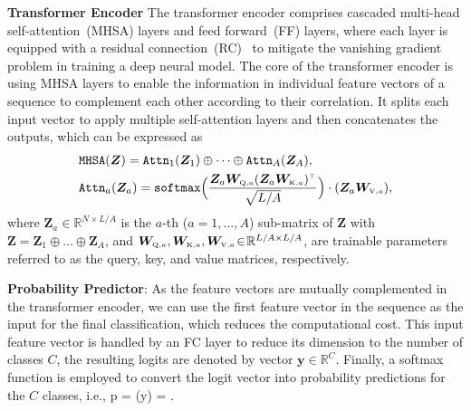 \textbf{Transformer Encoder}
The transformer encoder comprises cascaded multi-head self-attention~(MHSA) layers and feed forward~(FF) layers, where each layer is equipped with a residual connection~(RC)~\cite{He2016_CVPR} to mitigate the vanishing gradient problem in training a deep neural model.
The core of the transformer encoder is using MHSA layers to enable the information in individual feature vectors of a sequence to complement each other according to their correlation.
%
It splits each input vector to apply multiple self-attention layers and then concatenates the outputs, which can be expressed as
\begin{align}
& \mathtt{MHSA}(\bm Z) = \mathtt{Attn}_{1}(\bm Z_1)\oplus \dots \oplus \mathtt{Attn}_{A}(\bm Z_{A}), \nonumber \\
& \mathtt{Attn}_{a}(\bm Z_a)  = \mathtt{softmax}\Big( \frac{\bm Z_a\bm W_{\scriptscriptstyle\mathrm{Q},a} (\bm Z_a \bm W_{\scriptscriptstyle\mathrm{K},a})^{\scriptscriptstyle\top}}{\sqrt{L/A}}
    \Big) \cdot (\bm Z_a \bm W_{\scriptscriptstyle\mathrm{V},a}),\nonumber 
\end{align}
where $\bm Z_a\in\mathbb R^{N\times L/A}$ is the $a$-th ($a=1,\dots,A$) sub-matrix of $\bm Z$ with $\bm Z = \bm Z_1\oplus\dots\oplus\bm Z_A$,
and $\bm W_{\scriptscriptstyle\mathrm{Q},a},\bm W_{\scriptscriptstyle\mathrm{K},a},\bm W_{\scriptscriptstyle\mathrm{V},a}\!\in\!\mathbb R^{L/A \times L/A }$, are trainable parameters referred to as the query, key, and value matrices, respectively.



\textbf{Probability Predictor}:
As the feature vectors are mutually complemented in the transformer encoder, we can use the first feature vector in the sequence as the input for the final classification, which reduces the computational cost.
This input feature vector is handled by an FC layer to reduce its dimension to the number of classes $C$, the resulting logits are denoted by vector $\bm y\in\mathbb R^C$.
Finally, a softmax function is employed to convert the logit vector into probability predictions for the $C$ classes, i.e.,
\beq
\bm p = (\bm y) =  .
\eeq


